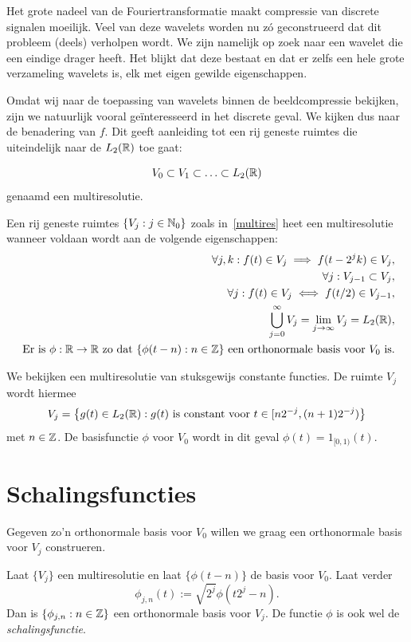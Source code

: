 Het grote nadeel van de Fouriertransformatie maakt compressie van discrete signalen moeilijk. Veel van deze wavelets worden nu z\'o geconstrueerd dat dit probleem (deels) verholpen wordt. We zijn namelijk op zoek naar een wavelet die een eindige drager heeft. Het blijkt dat deze bestaat en dat er zelfs een hele grote verzameling wavelets is, elk met eigen gewilde eigenschappen.

Omdat wij naar de toepassing van wavelets binnen de beeldcompressie bekijken, zijn we natuurlijk vooral ge\"interesseerd in het discrete geval. We kijken dus naar de benadering van $f$. Dit geeft aanleiding tot een rij geneste ruimtes die uiteindelijk naar de $L_2(\mathbb{R})$ toe gaat:

\begin{equation}
  \label{multires}
  V_0 \subset V_1 \subset \ldots \subset L_2(\mathbb{R})
\end{equation}
genaamd een multiresolutie.
\begin{definitie}
  Een rij geneste ruimtes $\{ V_j: j \in \mathbb{N}_0 \}$ zoals in~\ref{multires} heet een multiresolutie wanneer voldaan wordt aan de volgende eigenschappen:
  \begin{eqnarray}
    \forall j, k: f(t) \in V_j \implies f(t - 2^j k) \in V_j, \\
    \forall j: V_{j-1} \subset V_j, \\
    \forall j: f(t) \in V_j \iff f(t/2) \in V_{j-1}, \\
    \bigcup_{j=0}^{\infty} V_j = \lim_{j\to\infty} V_j = L_2(\mathbb{R}), \\
    \text{ Er is $\phi: \mathbb{R} \to \mathbb{R}$ zo dat $\{ \phi(t-n): n \in \mathbb{Z} \}$ een orthonormale basis voor $V_0$ is.}
  \end{eqnarray}
\end{definitie}

\begin{voorbeeld} We bekijken een multiresolutie van stuksgewijs constante functies. De ruimte $V_j$ wordt hiermee
  \[
  V_j = \left\{ g(t) \in L_2(\mathbb{R}): g(t)\text{ is constant voor }t \in [n 2^{-j}, (n+1)2^{-j}) \right \}
    \]
    met $n \in \mathbb{Z}$. De basisfunctie $\phi$ voor $V_0$ wordt in dit geval $\phi(t) = 1_{[0,1)}(t)$.
\end{voorbeeld}

\section{Schalingsfuncties}
Gegeven zo'n orthonormale basis voor $V_0$ willen we graag een orthonormale basis voor $V_j$ construeren.
\begin{stelling}
  Laat $\{ V_j \}$ een multiresolutie en laat $\{\phi(t-n) \}$ de basis voor $V_0$. Laat verder
  \[
  \phi_{j,n}(t) := \sqrt{2^j} \phi\left( t2^j - n \right).
  \]
  Dan is $\{ \phi_{j,n}: n \in \mathbb{Z} \}$ een orthonormale basis voor $V_j$. De functie $\phi$ is ook wel de \emph{schalingsfunctie}.
\end{stelling}
